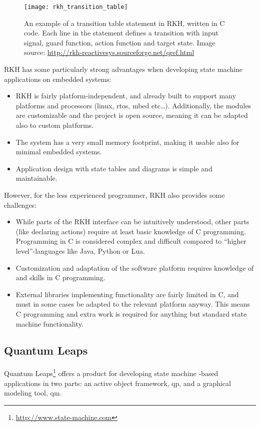 \begin{figure}[htp]
	\centering
	\texttt{[image: rkh\_transition\_table]}
	\caption[A transition table statement in RKH]{An example of a transition table statement in RKH, written in C code. Each line in the statement defines a transition with input signal, guard function, action function and target state. Image source: \url{http://rkh-reactivesys.sourceforge.net/qref.html}}
	\label{figure:rkh_transition}
\end{figure}

RKH has some particularly strong advantages when developing state machine applications on embedded systems:
\begin{itemize}
\item RKH is fairly platform-independent, and already built to support many platforms and processors (linux, \gls{rtos}, mbed etc…). Additionally, the modules are customizable and the project is open source, meaning it can be adapted also to custom platforms.
\item The system has a very small memory footprint, making it usable also for minimal embedded systems.
\item Application design with state tables and diagrams is simple and maintainable.
\end{itemize}

However, for the less experienced programmer, RKH also provides some challenges:
\begin{itemize}
	\item While parts of the RKH interface can be intuitively understood, other parts (like declaring actions) require at least basic knowledge of C programming. Programming in C is considered complex and difficult compared to ``higher level''-languages like Java, Python or Lua.
	\item Customization and adaptation of the software platform requires knowledge of and skills in C programming.
	\item External libraries implementing functionality are fairly limited in C, and must in some cases be adapted to the relevant platform anyway. This means C programming and extra work is required for anything but standard state machine functionality.
\end{itemize}

\subsection{Quantum Leaps}
\label{sec:quantum_leaps}
Quantum Leaps\footnote{\url{http://www.state-machine.com}} offers a product for developing state machine -based applications in two parts: an active object framework, \gls{qp}, and a graphical modeling tool, \gls{qm}.

